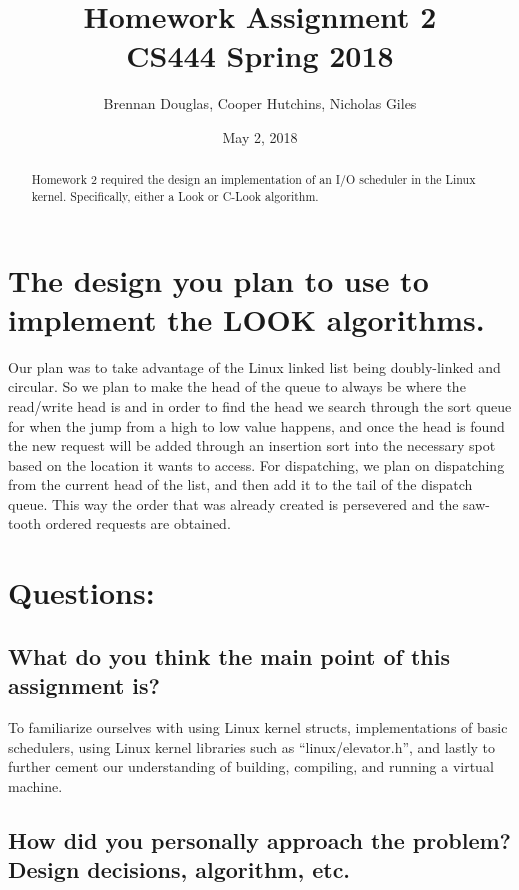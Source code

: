 \documentclass[onecolumn, draftclsnofoot,10pt, compsoc]{IEEEtran}
\title{Homework Assignment 2\\\large CS444 Spring 2018}
\author{Brennan Douglas, Cooper Hutchins, Nicholas Giles}
\date{May 2, 2018}
\begin{document}
\begin{titlingpage}
			\maketitle
      \begin{abstract}
			\noindent Homework 2 required the design an implementation of an I/O scheduler in the Linux kernel.  Specifically, either a Look or C-Look algorithm.
      \end{abstract}
\end{titlingpage}

\newpage
{}

\clearpage
\singlespace


\section{The design you plan to use to implement the LOOK algorithms.}

Our plan was to take advantage of the Linux linked list being doubly-linked and circular. \cite{roman10} So we plan to make the head of the queue to always be where the read/write head is and in order to find the head we search through the sort queue for when the jump from a high to low value happens, and once the head is found the new request will be added through an insertion sort into the necessary spot based on the location it wants to access. For dispatching, we plan on dispatching from the current head of the list, and then add it to the tail of the dispatch queue.  This way the order that was already created is persevered and the saw-tooth ordered requests are obtained.

\section{Questions:}
\subsection{What do you think the main point of this assignment is?}

To familiarize ourselves with using Linux kernel structs, implementations of basic schedulers, using Linux kernel libraries such as “linux/elevator.h”, and lastly to further cement our understanding of building, compiling, and running a virtual machine.

\subsection{How did you personally approach the problem? Design decisions, algorithm, etc.}
\end{document}

